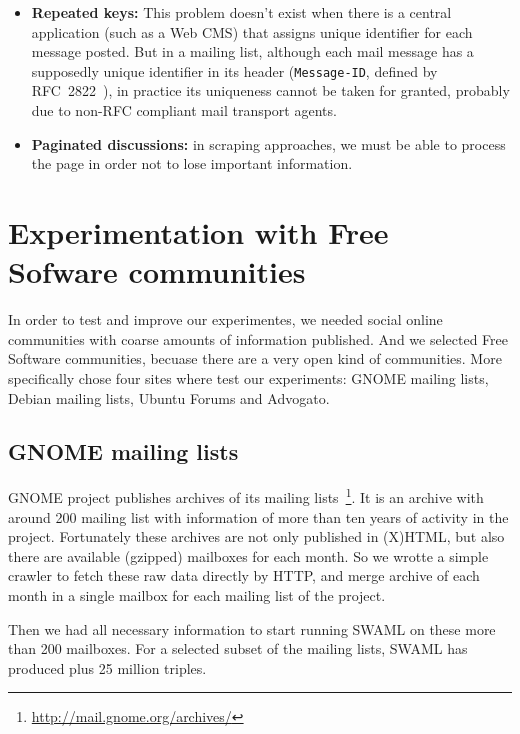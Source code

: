 \documentclass{../templates/www2008-submission}
\begin{document}
\begin{itemize}
  \item \textbf{Repeated keys:} This problem doesn't exist when there is a 
	central application (such as a Web CMS) that assigns unique identifier 
	for each message posted. But in a mailing list, although each mail 
	message has a supposedly unique identifier in its header 
	(\texttt{Message-ID}, defined by RFC~2822~\cite{RFC2822}), 
	in practice its uniqueness cannot be taken for granted,
	probably due to non-RFC compliant mail transport agents.

  \item \textbf{Paginated discussions:} in scraping approaches, we must be able 
	to process the page in order not to lose important information.

\end{itemize}


\section{Experimentation with Free\\ Sofware communities}

In order to test and improve our experimentes, we needed social
online communities with coarse amounts of information published.
And we selected Free Software communities, becuase there are a very
open kind of communities. More specifically chose four sites where
test our experiments: GNOME mailing lists, Debian mailing lists,
Ubuntu Forums and Advogato.

\subsection{\label{sec:gnome}GNOME mailing lists}

GNOME project publishes archives of its mailing lists~\footnote{\url{http://mail.gnome.org/archives/}}.
It is an archive with around 200 mailing list with information of 
more than ten years of activity in the project. Fortunately these
archives are not only published in (X)HTML, but also there are 
available (gzipped) mailboxes for each month. So we wrotte a simple
crawler to fetch these raw data directly by HTTP, and merge archive
of each month in a single mailbox for each mailing list of the project.

Then we had all necessary information to start running SWAML on these 
more than 200 mailboxes. For a selected subset of the mailing lists, 
SWAML has produced plus 25 million triples.
\end{document}
